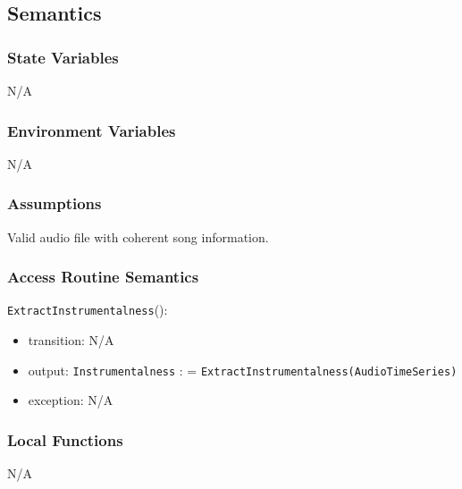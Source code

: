 \documentclass[12pt, titlepage]{article}
\begin{document}
\subsection{Semantics}

\subsubsection{State Variables}
N/A

\subsubsection{Environment Variables}
N/A

\subsubsection{Assumptions}
Valid audio file with coherent song information.

\subsubsection{Access Routine Semantics}

\noindent \texttt{ExtractInstrumentalness}():
\begin{itemize}
\item transition: N/A
\item output: \texttt{Instrumentalness} : = \texttt{ExtractInstrumentalness(Audio\textunderscore Time\textunderscore Series)}
\item exception: N/A
\end{itemize}

\subsubsection{Local Functions}
N/A
\end{document}
